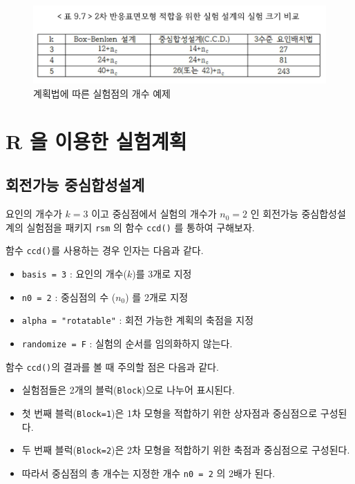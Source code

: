 \documentclass[
]{book}
\providecommand{\tightlist}{%
  \setlength{\itemsep}{0pt}\setlength{\parskip}{0pt}}
\theoremstyle{definition}
\theoremstyle{definition}
\theoremstyle{definition}
\theoremstyle{definition}
\theoremstyle{remark}
\begin{document}
\begin{figure}

{\centering \includegraphics[width=0.8\linewidth]{myimages/exp-number} 

}

\caption{계획법에 따른 실험점의 개수 예제}\label{fig:unnamed-chunk-29}
\end{figure}

\hypertarget{r-uxc744-uxc774uxc6a9uxd55c-uxc2e4uxd5d8uxacc4uxd68d}{%
\section{R 을 이용한 실험계획}\label{r-uxc744-uxc774uxc6a9uxd55c-uxc2e4uxd5d8uxacc4uxd68d}}

\hypertarget{uxd68cuxc804uxac00uxb2a5-uxc911uxc2ecuxd569uxc131uxc124uxacc4-1}{%
\subsection{회전가능 중심합성설계}\label{uxd68cuxc804uxac00uxb2a5-uxc911uxc2ecuxd569uxc131uxc124uxacc4-1}}

요인의 개수가 \(k=3\) 이고 중심점에서 실험의 개수가 \(n_0=2\) 인 회전가능 중심합성설계의 실험점을
패키지 \texttt{rsm} 의 함수 \texttt{ccd()} 를 통하여 구해보자.

함수 \texttt{ccd()}를 사용하는 경우 인자는 다음과 같다.

\begin{itemize}
\tightlist
\item
  \texttt{basis\ =\ 3} : 요인의 개수(\(k\))를 3개로 지정
\item
  \texttt{n0\ =\ 2} : 중심점의 수 (\(n_0\)) 를 2개로 지정
\item
  \texttt{alpha\ =\ "rotatable"} : 회전 가능한 계획의 축점을 지정
\item
  \texttt{randomize\ =\ F} : 실험의 순서를 임의화하지 않는다.
\end{itemize}

함수 \texttt{ccd()}의 결과를 볼 때 주의할 점은 다음과 같다.

\begin{itemize}
\tightlist
\item
  실험점들은 2개의 블럭(\texttt{Block})으로 나누어 표시된다.
\item
  첫 번째 블럭(\texttt{Block=1})은 1차 모형을 적합하기 위한 상자점과 중심점으로 구성된다.
\item
  두 번째 블럭(\texttt{Block=2})은 2차 모형을 적합하기 위한 축점과 중심점으로 구성된다.
\item
  따라서 중심점의 총 개수는 지정한 개수 \texttt{n0\ =\ 2} 의 2배가 된다.
\end{itemize}
\end{document}
